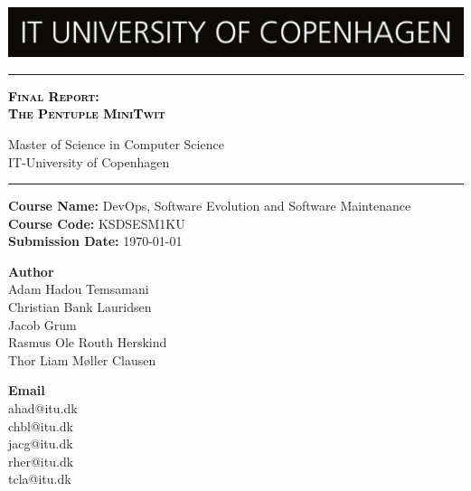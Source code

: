 
\begin{titlepage}

    \centering
    \includegraphics[width=\textwidth]{images/ITU_logo.jpg}
        \textcolor{black}{\rule{\linewidth}{1pt}} \par
         {\scshape\Huge\bfseries \textcolor{black}{Final Report: \\ The Pentuple MiniTwit}\par} 
        \vspace{1pt} {Master of Science in Computer Science \\ 
        IT-University of Copenhagen \par}
        \textcolor{black}{\rule{\linewidth}{1pt}} \par
        \vspace*{0.25cm}
     \textbf{Course Name:} DevOps, Software Evolution and Software Maintenance \\
    \textbf{Course Code:} KSDSESM1KU \\
    \textbf{Submission Date:} \today\\
     
    \vspace*{0.25cm}
     
    \begin{minipage}{0.75\textwidth}
        \begin{flushleft} \large
            \textbf{Author}\\
            Adam Hadou Temsamani \\
            Christian Bank Lauridsen \\
            Jacob Grum \\
            Rasmus Ole Routh Herskind \\
            Thor Liam Møller Clausen
        \end{flushleft}
        \end{minipage}
        \begin{minipage}{0.20\textwidth}
        \begin{flushright} \large
            \textbf{Email}\\
            ahad@itu.dk \\
            chbl@itu.dk \\
            jacg@itu.dk \\
            rher@itu.dk \\
            tcla@itu.dk
        \end{flushright}
    \end{minipage}
    
    \end{titlepage}
    